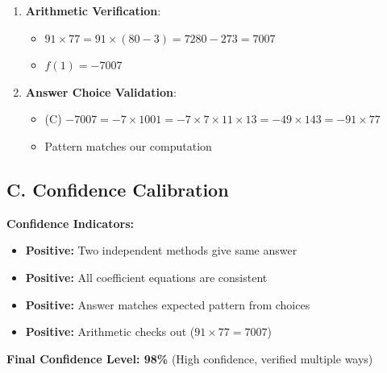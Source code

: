 \documentclass[]{article}
\begin{document}
\begin{verificationbox}
\begin{enumerate}[leftmargin=*]
    \item \textbf{Arithmetic Verification}:
    \begin{itemize}
        \item $91 \times 77 = 91 \times (80-3) = 7280 - 273 = 7007$
        \item $f(1) = -7007$ \checkmark
    \end{itemize}
    
    \item \textbf{Answer Choice Validation}:
    \begin{itemize}
        \item (C) $-7007 = -7 \times 1001 = -7 \times 7 \times 11 \times 13 = -49 \times 143 = -91 \times 77$ \checkmark
        \item Pattern matches our computation
    \end{itemize}
\end{enumerate}

\subsection*{C. Confidence Calibration}

\textbf{Confidence Indicators:}
\begin{itemize}[leftmargin=*]
    \item \textcolor{green!70!black}{\textbf{Positive:}} Two independent methods give same answer
    \item \textcolor{green!70!black}{\textbf{Positive:}} All coefficient equations are consistent
    \item \textcolor{green!70!black}{\textbf{Positive:}} Answer matches expected pattern from choices
    \item \textcolor{green!70!black}{\textbf{Positive:}} Arithmetic checks out ($91 \times 77 = 7007$)
\end{itemize}

\textbf{Final Confidence Level: 98\%} (High confidence, verified multiple ways)
\end{verificationbox}
\end{document}
